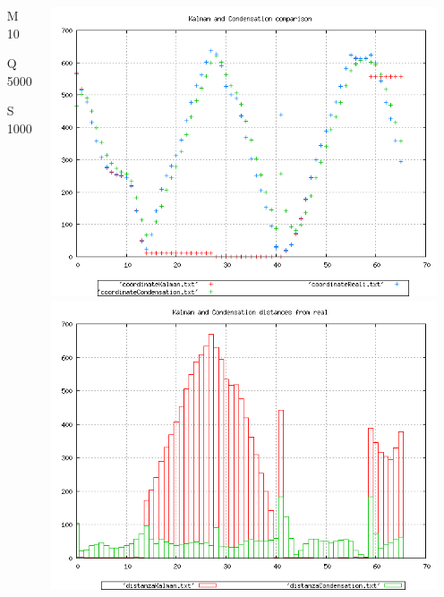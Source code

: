 {\begin{columns}
\begin{scriptsize}
\begin{itemize}
\item [M]10
\item [Q]5000
\item [S]1000
\end{itemize}
\end{scriptsize}
\includegraphics[scale=0.1]{../esperimenti/single_car/mod_10-Q_5000-S_1000/plot.png}\\
\includegraphics[scale=0.1]{../esperimenti/single_car/mod_10-Q_5000-S_1000/plot-distances.png}


\end{columns}}
